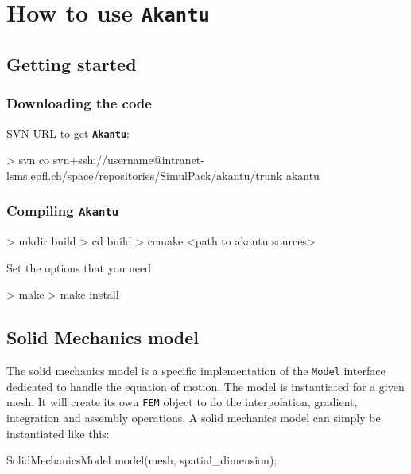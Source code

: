 \documentclass[a4paper,11pt]{book}
\newcommand{\akantu}{\texttt{\textbf{Akantu}}\xspace}
\newcommand{\code}[1]{\texttt{#1}}
\begin{document}
\chapter{How to use \akantu}
\section{Getting started}
\subsection{Downloading the code}
SVN URL to get \akantu :
\begin{command}
> svn co svn+ssh://username@intranet-lsms.epfl.ch/space/repositories/SimulPack/akantu/trunk akantu
\end{command}

\subsection{Compiling \akantu}
\begin{command}
> mkdir build
> cd build
> ccmake <path to akantu sources>
\end{command}

Set the options that you need

\begin{command}
> make
> make install
\end{command}

\section{Solid Mechanics model}

The  solid mechanics  model is  a  specific implementation  of the  \code{Model}
interface dedicated to handle the  equation of motion. The model is instantiated
for  a  given  mesh.  It  will  create  its  own  \code{FEM}  object to  do  the
interpolation, gradient, integration and  assembly operations. A solid mechanics
model can simply be instantiated like this:
\begin{cpp}
SolidMechanicsModel model(mesh, spatial_dimension);
\end{cpp}
\end{document}

